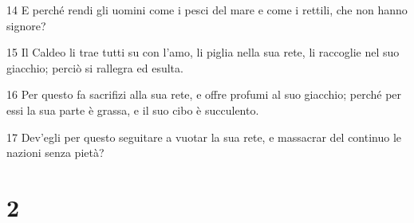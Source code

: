 \par 14 E perché rendi gli uomini come i pesci del mare e come i rettili, che non hanno signore?
\par 15 Il Caldeo li trae tutti su con l'amo, li piglia nella sua rete, li raccoglie nel suo giacchio; perciò si rallegra ed esulta.
\par 16 Per questo fa sacrifizi alla sua rete, e offre profumi al suo giacchio; perché per essi la sua parte è grassa, e il suo cibo è succulento.
\par 17 Dev'egli per questo seguitare a vuotar la sua rete, e massacrar del continuo le nazioni senza pietà?

\chapter{2}

